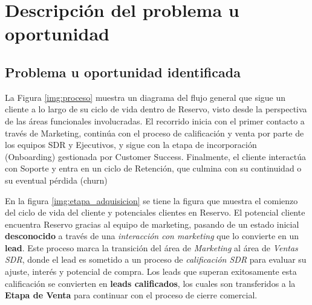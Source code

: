 
\section{Descripción del problema u oportunidad}

\subsection{Problema u oportunidad identificada}


La Figura \ref{img:proceso} muestra un diagrama del flujo general que sigue un cliente a lo largo de su ciclo de vida dentro de Reservo, visto desde la perspectiva de las áreas funcionales involucradas. El recorrido inicia con el primer contacto a través de Marketing, continúa con el proceso de calificación y venta por parte de los equipos SDR y Ejecutivos, y sigue con la etapa de incorporación (Onboarding) gestionada por Customer Success. Finalmente, el cliente interactúa con Soporte y entra en un ciclo de Retención, que culmina con su continuidad o su eventual pérdida (churn)


En la figura \ref{img:etapa_adquisicion} se tiene la figura que muestra el comienzo del ciclo de vida del cliente y potenciales clientes en Reservo. El potencial cliente encuentra Reservo gracias al equipo de marketing, pasando de un estado inicial \textbf{desconocido} a través de una \textit{interacción con marketing} que lo convierte en un \textbf{lead}. Este proceso marca la transición del área de \textit{Marketing} al área de \textit{Ventas SDR}, donde el lead es sometido a un proceso de \textit{calificación SDR} para evaluar su ajuste, interés y potencial de compra. Los leads que superan exitosamente esta calificación se convierten en \textbf{leads calificados}, los cuales son transferidos a la \textbf{Etapa de Venta} para continuar con el proceso de cierre comercial.

